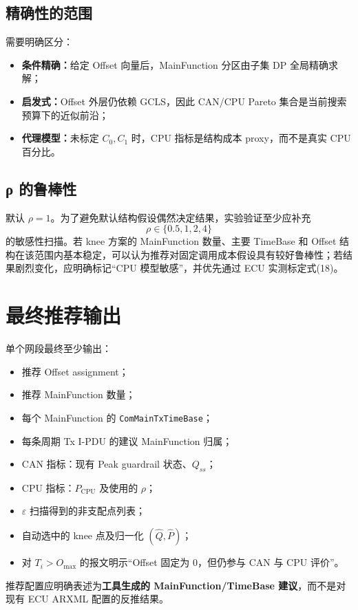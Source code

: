 \documentclass[11pt,a4paper,fontset=none]{ctexart}
\begin{document}
\subsection{精确性的范围}
需要明确区分：
\begin{itemize}
  \item \textbf{条件精确：}给定 Offset 向量后，MainFunction 分区由子集 DP 全局精确求解；
  \item \textbf{启发式：}Offset 外层仍依赖 GCLS，因此 CAN/CPU Pareto 集合是当前搜索预算下的近似前沿；
  \item \textbf{代理模型：}未标定 $C_0,C_1$ 时，CPU 指标是结构成本 proxy，而不是真实 CPU 百分比。
\end{itemize}

\subsection{ρ 的鲁棒性}
默认 $\rho=1$。为了避免默认结构假设偶然决定结果，实验验证至少应补充
\[
\rho\in\{0.5,1,2,4\}
\tag{53}
\]
的敏感性扫描。若 knee 方案的 MainFunction 数量、主要 TimeBase 和 Offset 结构在该范围内基本稳定，可以认为推荐对固定调用成本假设具有较好鲁棒性；若结果剧烈变化，应明确标记“CPU 模型敏感”，并优先通过 ECU 实测标定式(18)。

\section{最终推荐输出}

单个网段最终至少输出：
\begin{itemize}
  \item 推荐 Offset assignment；
  \item 推荐 MainFunction 数量；
  \item 每个 MainFunction 的 \texttt{ComMainTxTimeBase}；
  \item 每条周期 Tx I-PDU 的建议 MainFunction 归属；
  \item CAN 指标：现有 Peak guardrail 状态、$Q_{ss}$；
  \item CPU 指标：$P_{\mathrm{CPU}}$ 及使用的 $\rho$；
  \item $\varepsilon$ 扫描得到的非支配点列表；
  \item 自动选中的 knee 点及归一化 $(\hat Q,\hat P)$；
  \item 对 $T_i>O_{\max}$ 的报文明示“Offset 固定为 0，但仍参与 CAN 与 CPU 评价”。
\end{itemize}

推荐配置应明确表述为\textbf{工具生成的 MainFunction/TimeBase 建议}，而不是对现有 ECU ARXML 配置的反推结果。
\end{document}
